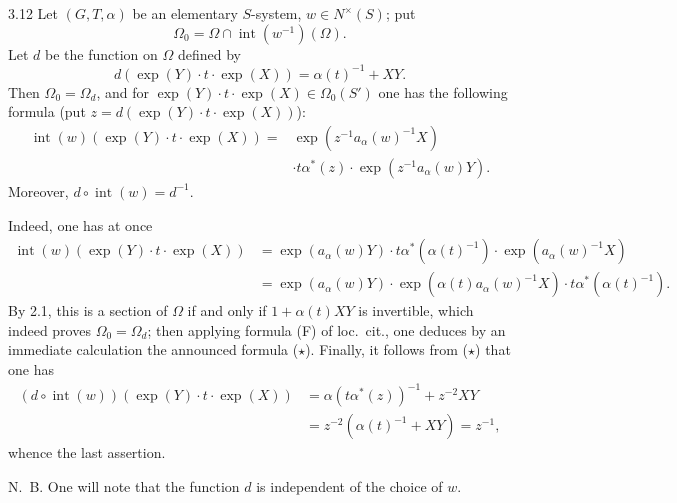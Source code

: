 \begin{proposition}{3.12}\label{XX.3.12}
Let $(G,T,\alpha)$ be an elementary $S$-system, $w\in N^\times(S)$; put
\[
\Omega_0=\Omega\cap\operatorname{int}(w^{-1})(\Omega).
\]
Let $d$ be the function on $\Omega$ defined by
\[
d(\exp(Y)\cdot t\cdot\exp(X))=\alpha(t)^{-1}+XY.
\]
Then $\Omega_0=\Omega_d$, and for $\exp(Y)\cdot t\cdot\exp(X)\in\Omega_0(S')$ one has the following formula (put $z=d(\exp(Y)\cdot t\cdot\exp(X))$):
\begin{equation}\tag{$\star$}\label{XX.eq.conjugation}
\begin{split}
\operatorname{int}(w)(\exp(Y)\cdot t\cdot\exp(X))={}&\exp(z^{-1}a_\alpha(w)^{-1}X)\\
&\cdot t\alpha^*(z)\cdot\exp(z^{-1}a_\alpha(w)Y).
\end{split}
\end{equation}
Moreover, $d\circ\operatorname{int}(w)=d^{-1}$.
\end{proposition}
Indeed, one has at once{\renewcommand{\thefootnote}{(30)}}
\[
\begin{aligned}
\operatorname{int}(w)(\exp(Y)\cdot t\cdot\exp(X))
&=\exp(a_\alpha(w)Y)\cdot t\alpha^*(\alpha(t)^{-1})\cdot\exp(a_\alpha(w)^{-1}X)\\
&=\exp(a_\alpha(w)Y)\cdot\exp(\alpha(t)a_\alpha(w)^{-1}X)\cdot t\alpha^*(\alpha(t)^{-1}).
\end{aligned}
\]
By 2.1, this is a section of $\Omega$ if and only if $1+\alpha(t)XY$ is invertible, which indeed proves $\Omega_0=\Omega_d$; then applying formula (F) of loc.~cit., one deduces by an immediate calculation the announced formula ($\star$). Finally, it follows from ($\star$) that one has
\[
\begin{split}
(d\circ\operatorname{int}(w))(\exp(Y)\cdot t\cdot\exp(X))
&=\alpha(t\alpha^*(z))^{-1}+z^{-2}XY\\
&=z^{-2}(\alpha(t)^{-1}+XY)=z^{-1},
\end{split}
\]
whence the last assertion.

N.~B. One will note that the function $d$ is independent of the choice of $w$.

